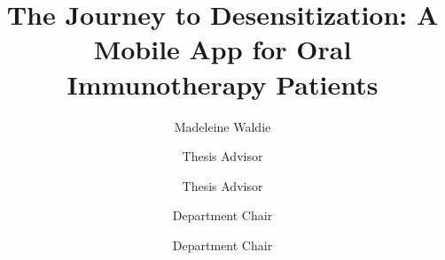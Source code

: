 \documentclass{scu-thesis}
\author{Madeleine Waldie}
\title{The Journey to Desensitization: A Mobile App for Oral Immunotherapy Patients}
\begin{document}
\frontmatter
\signature{Thesis Advisor}
\signature{Thesis Advisor}
\signature{Department Chair}
\signature{Department Chair}

\maketitle


\tableofcontents
\listoftables
\listoffigures

\mainmatter








% 
% 
% 




\backmatter
\end{document}
